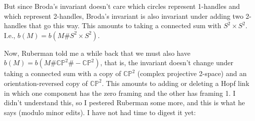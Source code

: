 \documentclass{article}
\begin{document}
But since Broda's invariant doesn't care which circles represent
1-handles and which represent 2-handles, Broda's invariant is also
invariant under adding two 2-handles that go this way. This amounts to
taking a connected sum with \(S^2 \times S^2\). I.e.,
\(b(M) = b(M\# S^2 \times S^2)\).

Now, Ruberman told me a while back that we must also have
\(b(M) = b(M\#\mathbb{CP}^2\#-\mathbb{CP}^2)\), that is, the invariant
doesn't change under taking a connected sum with a copy of
\(\mathbb{CP}^2\) (complex projective 2-space) and an
orientation-reversed copy of \(\mathbb{CP}^2\). This amounts to adding
or deleting a Hopf link in which one component has the zero framing and
the other has framing 1. I didn't understand this, so I pestered
Ruberman some more, and this is what he says (modulo minor edits). I
have not had time to digest it yet:
\end{document}
